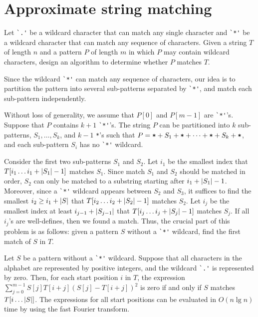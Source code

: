 \section{Approximate string matching}
\begin{Exercise}[title=Wildcard matching]
Let \verb+`.'+ be a wildcard character that can match any single character and \verb+`*'+ be a wildcard character that can match any sequence of characters.
Given a string $T$ of length $n$ and a pattern $P$ of length $m$ in which $P$ may contain wildcard characters, design an algorithm to determine whether $P$ matches $T$.
\end{Exercise}
\begin{Answer}
Since the wildcard \verb+`*'+ can match any sequence of characters, our idea is to partition the pattern into several sub-patterns separated by \verb+`*'+, and match each sub-pattern independently.

Without loss of generality, we assume that $P[0]$ and $P[m - 1]$ are \verb+`*'+'s.
Suppose that $P$ contains $k + 1$ \verb+`*'+'s. 
The string $P$ can be partitioned into $k$ sub-patterns, $S_1, \dots, S_{k}$, and $k - 1$ \verb'*''s such that $P = \text{\texttt{*}}  + S_1 + \text{\texttt{*}} + \dots + \text{\texttt{*}} + S_{k} + \text{\texttt{*}}$, and each sub-pattern $S_i$ has no \verb+`*'+ wildcard.

Consider the first two sub-patterns $S_1$ and $S_2$.
Let $i_1$ be the smallest index that $T[i_1 \dots i_1 + \lvert S_1\rvert - 1]$ matches $S_1$.
Since match $S_1$ and $S_2$ should be matched in order, $S_2$ can only be matched to a substring starting after $i_1 + \lvert S_1\rvert - 1$.
Moreover, since a \verb+`*'+ wildcard appears between $S_2$ and $S_3$, it suffices to find the smallest $i_2 \geq i_1 + \lvert S\rvert$ that $T[i_2 \dots i_2 + \lvert S_2\rvert - 1]$ matches $S_2$.
Let $i_j$ be the smallest index at least $i_{j-1} + \lvert S_{j-1}\rvert$ that $T[i_j \dots i_j + \lvert S_j\rvert - 1]$ matches $S_j$.
If all $i_j$'s are well-defines, then we found a match.
Thus, the crucial part of this problem is as follows: given a pattern $S$ without a \verb+`*'+ wildcard, find the first match of $S$ in $T$.

Let $S$ be a pattern without a \verb+`*'+ wildcard. 
Suppose that all characters in the alphabet are represented by positive integers, and the wildcard \verb+`.'+ is represented by zero. 
Then, for each start position $i$ in $T$, the expression $\sum_{j=0}^{m-1} S[j] T[i + j] (S[j] - T[i + j])^2$ is zero if and only if $S$ matches $T[i \dots \lvert S\rvert]$. 
The expressions for all start positions can be evaluated in $O(n \lg n)$ time by using the fast Fourier transform.


\end{Answer}
